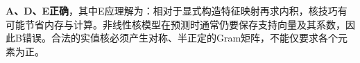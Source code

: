 \textbf{A、D、E正确}，其中E应理解为：相对于显式构造特征映射再求内积，核技巧有可能节省内存与计算。非线性核模型在预测时通常仍要保存支持向量及其系数，因此B错误。合法的实值核必须产生对称、半正定的Gram矩阵，不能仅要求各个元素为正。
